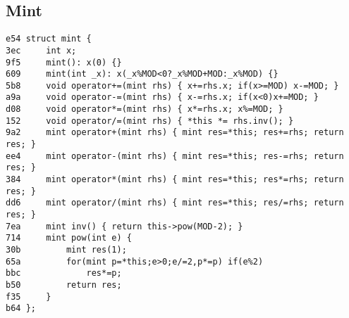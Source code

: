 \documentclass[11pt, a4paper, twoside]{article}
\begin{document}
\subsection{Mint}
\begin{lstlisting}
e54 struct mint {
3ec 	int x;
9f5 	mint(): x(0) {}
609 	mint(int _x): x(_x%MOD<0?_x%MOD+MOD:_x%MOD) {}
5b8 	void operator+=(mint rhs) { x+=rhs.x; if(x>=MOD) x-=MOD; }
a9a 	void operator-=(mint rhs) { x-=rhs.x; if(x<0)x+=MOD; }
d08 	void operator*=(mint rhs) { x*=rhs.x; x%=MOD; }
152 	void operator/=(mint rhs) { *this *= rhs.inv(); }
9a2 	mint operator+(mint rhs) { mint res=*this; res+=rhs; return res; }
ee4 	mint operator-(mint rhs) { mint res=*this; res-=rhs; return res; }
384 	mint operator*(mint rhs) { mint res=*this; res*=rhs; return res; }
dd6 	mint operator/(mint rhs) { mint res=*this; res/=rhs; return res; }
7ea 	mint inv() { return this->pow(MOD-2); }
714 	mint pow(int e) {
30b 		mint res(1);
65a 		for(mint p=*this;e>0;e/=2,p*=p) if(e%2)
bbc 			res*=p;
b50 		return res;
f35 	}
b64 };
\end{lstlisting}
\end{document}
